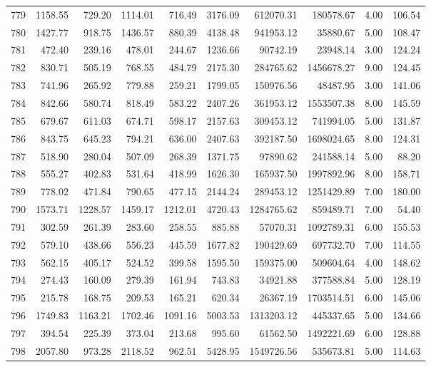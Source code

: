 \begin{tabular}{lrrrrrrrrr}
779 & 1158.55 & 729.20 & 1114.01 & 716.49 & 3176.09 & 612070.31 & 180578.67 & 4.00 & 106.54 \\
780 & 1427.77 & 918.75 & 1436.57 & 880.39 & 4138.48 & 941953.12 & 35880.67 & 5.00 & 108.47 \\
781 & 472.40 & 239.16 & 478.01 & 244.67 & 1236.66 & 90742.19 & 23948.14 & 3.00 & 124.24 \\
782 & 830.71 & 505.19 & 768.55 & 484.79 & 2175.30 & 284765.62 & 1456678.27 & 9.00 & 124.45 \\
783 & 741.96 & 265.92 & 779.88 & 259.21 & 1799.05 & 150976.56 & 48487.95 & 3.00 & 141.06 \\
784 & 842.66 & 580.74 & 818.49 & 583.22 & 2407.26 & 361953.12 & 1553507.38 & 8.00 & 145.59 \\
785 & 679.67 & 611.03 & 674.71 & 598.17 & 2157.63 & 309453.12 & 741994.05 & 5.00 & 131.87 \\
786 & 843.75 & 645.23 & 794.21 & 636.00 & 2407.63 & 392187.50 & 1698024.65 & 8.00 & 124.31 \\
787 & 518.90 & 280.04 & 507.09 & 268.39 & 1371.75 & 97890.62 & 241588.14 & 5.00 & 88.20 \\
788 & 555.27 & 402.83 & 531.64 & 418.99 & 1626.30 & 165937.50 & 1997892.96 & 8.00 & 158.71 \\
789 & 778.02 & 471.84 & 790.65 & 477.15 & 2144.24 & 289453.12 & 1251429.89 & 7.00 & 180.00 \\
790 & 1573.71 & 1228.57 & 1459.17 & 1212.01 & 4720.43 & 1284765.62 & 859489.71 & 7.00 & 54.40 \\
791 & 302.59 & 261.39 & 283.60 & 258.55 & 885.88 & 57070.31 & 1092789.31 & 6.00 & 155.53 \\
792 & 579.10 & 438.66 & 556.23 & 445.59 & 1677.82 & 190429.69 & 697732.70 & 7.00 & 114.55 \\
793 & 562.15 & 405.17 & 524.52 & 399.58 & 1595.50 & 159375.00 & 509604.64 & 4.00 & 148.62 \\
794 & 274.43 & 160.09 & 279.39 & 161.94 & 743.83 & 34921.88 & 377588.84 & 5.00 & 128.19 \\
795 & 215.78 & 168.75 & 209.53 & 165.21 & 620.34 & 26367.19 & 1703514.51 & 6.00 & 145.06 \\
796 & 1749.83 & 1163.21 & 1702.46 & 1091.16 & 5003.53 & 1313203.12 & 445337.65 & 5.00 & 134.66 \\
797 & 394.54 & 225.39 & 373.04 & 213.68 & 995.60 & 61562.50 & 1492221.69 & 6.00 & 128.88 \\
798 & 2057.80 & 973.28 & 2118.52 & 962.51 & 5428.95 & 1549726.56 & 535673.81 & 5.00 & 114.63 \\

\end{tabular}
